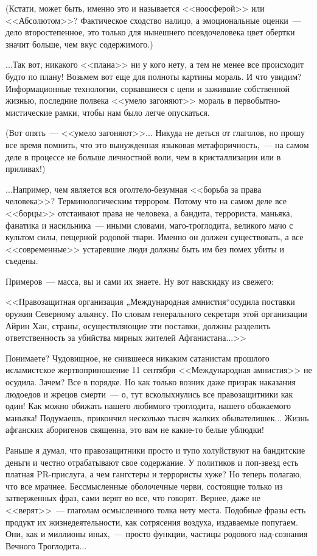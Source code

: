 \documentclass{scrbook}
\newcommand{\flqq}{<<}
\newcommand{\frqq}{>>}
\newcommand{\mdash}{~--- }
\newcommand{\commamdash}{~--- } %
\begin{document}
(Кстати, может быть, именно это и называется {\flqq}ноосферой{\frqq} или {\flqq}Абсолютом{\frqq}? Фактическое сходство налицо, а эмоциональные оценки{\mdash}дело второстепенное, это только для нынешнего псевдочеловека цвет обертки значит больше, чем вкус содержимого.)

...Так вот, никакого {\flqq}плана{\frqq} ни у кого нету, а тем не менее все происходит будто по плану! Возьмем вот еще для полноты картины мораль. И что увидим? Информационные технологии, сорвавшиеся с цепи и зажившие собственной жизнью, последние полвека {\flqq}умело загоняют{\frqq} мораль в первобытно-мистические рамки, чтобы нам было легче опускаться.

(Вот опять{\mdash}{\flqq}умело загоняют{\frqq}... Никуда не деться от глаголов, но прошу все время помнить, что это вынужденная языковая метафоричность,{\commamdash}на самом деле в процессе не больше личностной воли, чем в кристаллизации или в приливах!)

...Например, чем является вся оголтело-безумная {\flqq}борьба за права человека{\frqq}? Терминологическим террором. Потому что на самом деле все {\flqq}борцы{\frqq} отстаивают права не человека, а бандита, террориста, маньяка, фанатика и насильника{\mdash}иными словами, маго-троглодита, великого мачо с культом силы, пещерной родовой твари. Именно он должен существовать, а все {\flqq}современные{\frqq} устаревшие люди должны быть им без помех убиты и съедены.

Примеров{\mdash}масса, вы и сами их знаете. Ну вот навскидку из свежего:

{\flqq}Правозащитная организация „Международная амнистия“осудила поставки оружия Северному альянсу. По словам генерального секретаря этой организации Айрин Хан, страны, осуществляющие эти поставки, должны разделить ответственность за убийства мирных жителей Афганистана...{\frqq}

Понимаете? Чудовищное, не снившееся никаким сатанистам прошлого исламистское жертвоприношение 11 сентября {\flqq}Международная амнистия{\frqq} не осудила. Зачем? Все в порядке. Но как только возник даже призрак наказания людоедов и жрецов смерти{\mdash}о, тут всколыхнулись все правозащитники как один! Как можно обижать нашего любимого троглодита, нашего обожаемого маньяка! Подумаешь, прикончил несколько тысяч жалких обывателишек... Жизнь афганских аборигенов священна, это вам не какие-то белые ублюдки!

Раньше я думал, что правозащитники просто и тупо холуйствуют на бандитские деньги и честно отрабатывают свое содержание. У политиков и поп-звезд есть платная PR-прислуга, а чем гангстеры и террористы хуже? Но теперь полагаю, что все мрачнее. Бессмысленные оболочечные черви, состоящие только из затверженных фраз, сами верят во все, что говорят. Вернее, даже не {\flqq}верят{\frqq}{\mdash}глаголам осмысленного толка нету места. Подобные фразы есть продукт их жизнедеятельности, как сотрясения воздуха, издаваемые попугаем. Они, как и миллионы иных,{\commamdash} просто функции, частицы родового над-сознания Вечного Троглодита...
\end{document}

